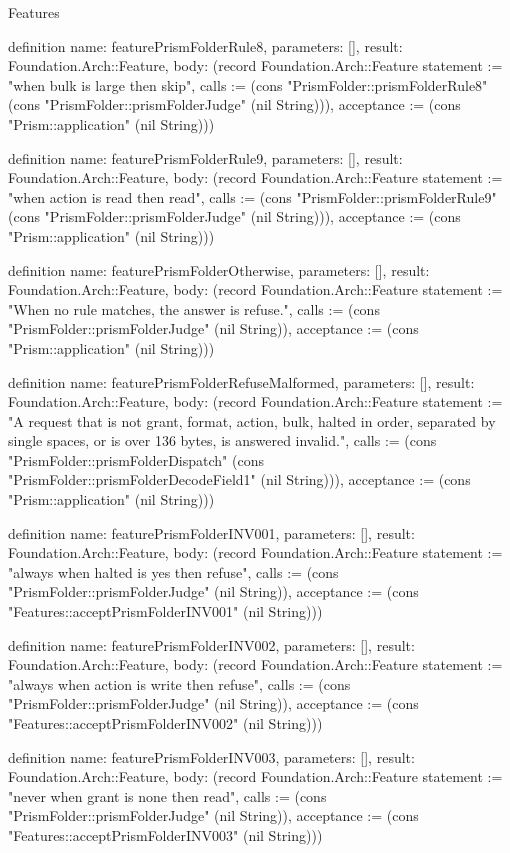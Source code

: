 \begin{lexlean}{Features}
\begin{semanticmodule}
definition{
  name: featurePrismFolderRule8,
  parameters: [],
  result: Foundation.Arch::Feature,
  body: (record Foundation.Arch::Feature {statement := "when bulk is large then skip", calls := (cons "PrismFolder::prismFolderRule8" (cons "PrismFolder::prismFolderJudge" (nil String))), acceptance := (cons "Prism::application" (nil String))})
}

definition{
  name: featurePrismFolderRule9,
  parameters: [],
  result: Foundation.Arch::Feature,
  body: (record Foundation.Arch::Feature {statement := "when action is read then read", calls := (cons "PrismFolder::prismFolderRule9" (cons "PrismFolder::prismFolderJudge" (nil String))), acceptance := (cons "Prism::application" (nil String))})
}

definition{
  name: featurePrismFolderOtherwise,
  parameters: [],
  result: Foundation.Arch::Feature,
  body: (record Foundation.Arch::Feature {statement := "When no rule matches, the answer is refuse.", calls := (cons "PrismFolder::prismFolderJudge" (nil String)), acceptance := (cons "Prism::application" (nil String))})
}

definition{
  name: featurePrismFolderRefuseMalformed,
  parameters: [],
  result: Foundation.Arch::Feature,
  body: (record Foundation.Arch::Feature {statement := "A request that is not grant, format, action, bulk, halted in order, separated by single spaces, or is over 136 bytes, is answered invalid.", calls := (cons "PrismFolder::prismFolderDispatch" (cons "PrismFolder::prismFolderDecodeField1" (nil String))), acceptance := (cons "Prism::application" (nil String))})
}

definition{
  name: featurePrismFolderINV001,
  parameters: [],
  result: Foundation.Arch::Feature,
  body: (record Foundation.Arch::Feature {statement := "always when halted is yes then refuse", calls := (cons "PrismFolder::prismFolderJudge" (nil String)), acceptance := (cons "Features::acceptPrismFolderINV001" (nil String))})
}

definition{
  name: featurePrismFolderINV002,
  parameters: [],
  result: Foundation.Arch::Feature,
  body: (record Foundation.Arch::Feature {statement := "always when action is write then refuse", calls := (cons "PrismFolder::prismFolderJudge" (nil String)), acceptance := (cons "Features::acceptPrismFolderINV002" (nil String))})
}

definition{
  name: featurePrismFolderINV003,
  parameters: [],
  result: Foundation.Arch::Feature,
  body: (record Foundation.Arch::Feature {statement := "never when grant is none then read", calls := (cons "PrismFolder::prismFolderJudge" (nil String)), acceptance := (cons "Features::acceptPrismFolderINV003" (nil String))})
}


\end{semanticmodule}
\end{lexlean}
